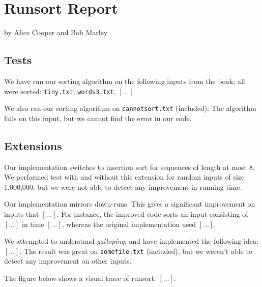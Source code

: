 \documentclass{tufte-handout}
\begin{document}
\newpage
\section{Runsort Report}


by Alice Cooper and Bob Marley

  \subsection{Tests}
  We have run our sorting algorithm on the following inputs from the book; all were sorted:
    {\tt tiny.txt}, {\tt words3.txt},  $[\ldots]$

  We also ran our sorting algorithm on {\tt cannotsort.txt} (included).
  The algorithm fails on this input, but we cannot find the error in our code.

  \subsection{Extensions}  

  Our implementation switches to insertion sort for sequences of length at most 8.
  We performed test with and without this extension for random inputs of size 1,000,000, but
  we were not able to detect any improvement in running time.

  Our implementation mirrors down-runs.
    This gives a significant improvement on inputs that $[\ldots]$.
  For instance, the improved code sorts an input consisting of $[\ldots]$ in time
  $[\ldots]$, whereas the original implementation used $[\ldots]$. 

  We attempted to understand \emph{galloping}, and have implemented the following idea: $[\ldots]$.
  The result was great on {\tt somefile.txt} (included), but we weren't able to detect any improvement on other inputs. 


  The figure below shows a visual trace of runsort:
  $[\ldots]$.
\end{document}
